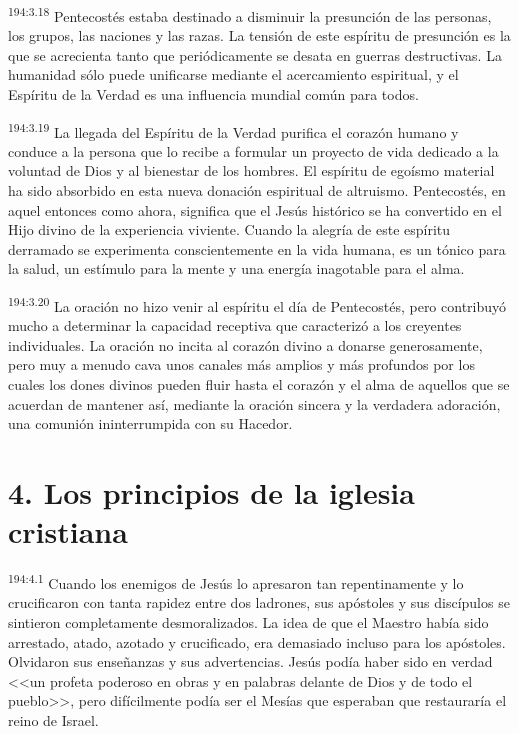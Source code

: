 \par 
\textsuperscript{194:3.18} Pentecostés estaba destinado a disminuir la presunción de las personas, los grupos, las naciones y las razas. La tensión de este espíritu de presunción es la que se acrecienta tanto que periódicamente se desata en guerras destructivas. La humanidad sólo puede unificarse mediante el acercamiento espiritual, y el Espíritu de la Verdad es una influencia mundial común para todos.

\par 
\textsuperscript{194:3.19} La llegada del Espíritu de la Verdad purifica el corazón humano y conduce a la persona que lo recibe a formular un proyecto de vida dedicado a la voluntad de Dios y al bienestar de los hombres. El espíritu de egoísmo material ha sido absorbido en esta nueva donación espiritual de altruismo. Pentecostés, en aquel entonces como ahora, significa que el Jesús histórico se ha convertido en el Hijo divino de la experiencia viviente. Cuando la alegría de este espíritu derramado se experimenta conscientemente en la vida humana, es un tónico para la salud, un estímulo para la mente y una energía inagotable para el alma.

\par 
\textsuperscript{194:3.20} La oración no hizo venir al espíritu el día de Pentecostés, pero contribuyó mucho a determinar la capacidad receptiva que caracterizó a los creyentes individuales. La oración no incita al corazón divino a donarse generosamente, pero muy a menudo cava unos canales más amplios y más profundos por los cuales los dones divinos pueden fluir hasta el corazón y el alma de aquellos que se acuerdan de mantener así, mediante la oración sincera y la verdadera adoración, una comunión ininterrumpida con su Hacedor.

\section*{4. Los principios de la iglesia cristiana}
\par 
\textsuperscript{194:4.1} Cuando los enemigos de Jesús lo apresaron tan repentinamente y lo crucificaron con tanta rapidez entre dos ladrones, sus apóstoles y sus discípulos se sintieron completamente desmoralizados. La idea de que el Maestro había sido arrestado, atado, azotado y crucificado, era demasiado incluso para los apóstoles. Olvidaron sus enseñanzas y sus advertencias. Jesús podía haber sido en verdad <<un profeta poderoso en obras y en palabras delante de Dios y de todo el pueblo>>, pero difícilmente podía ser el Mesías que esperaban que restauraría el reino de Israel.

